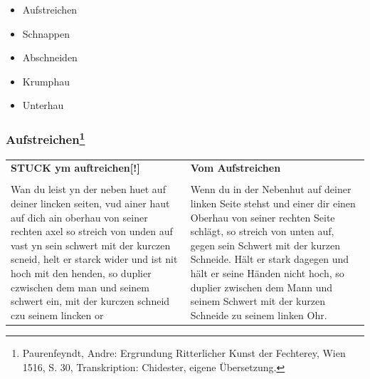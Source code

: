 \begin{itemize}
    \item Aufstreichen
    \item Schnappen
    \item Abschneiden
    \item Krumphau
\end{itemize}

\hspace{0.5cm}

\begin{itemize}
    \item Unterhau
\end{itemize}

\newpage
\null
\thispagestyle{empty}
\newpage

\subsubsection[Aufstreichen]{
    Aufstreichen\footnote{
        \hspace*{0.5ex}Paurenfeyndt, Andre: Ergrundung Ritterlicher Kunst der Fechterey, Wien 1516, S. 30,
        Transkription: Chidester, eigene Übersetzung.}}

\begin{longtable}{p{6.25cm}p{6.25cm}}
    \textbf{
        STUCK ym auftreichen[!]}
    &
    \textbf{
        Vom Aufstreichen}
    \\
    \\
    Wan du leist yn der neben huet auf deiner lincken seiten, vud ainer haut auf dich ain oberhau von seiner rechten axel so streich von unden auf vast yn sein schwert mit der kurczen scneid,
    helt er starck wider und ist nit hoch mit den henden, so duplier czwischen dem man und seinem schwert ein, mit der kurczen schneid czu seinem lincken or
    &
    Wenn du in der Nebenhut auf deiner linken Seite stehst und einer dir einen Oberhau von seiner rechten Seite schlägt, so streich von unten auf, gegen sein Schwert mit der kurzen Schneide.
    Hält er stark dagegen und hält er seine Händen nicht hoch, so duplier zwischen dem Mann und seinem Schwert mit der kurzen Schneide zu seinem linken Ohr.
\end{longtable}

\newpage

\begin{center}
\end{center}

\newpage

